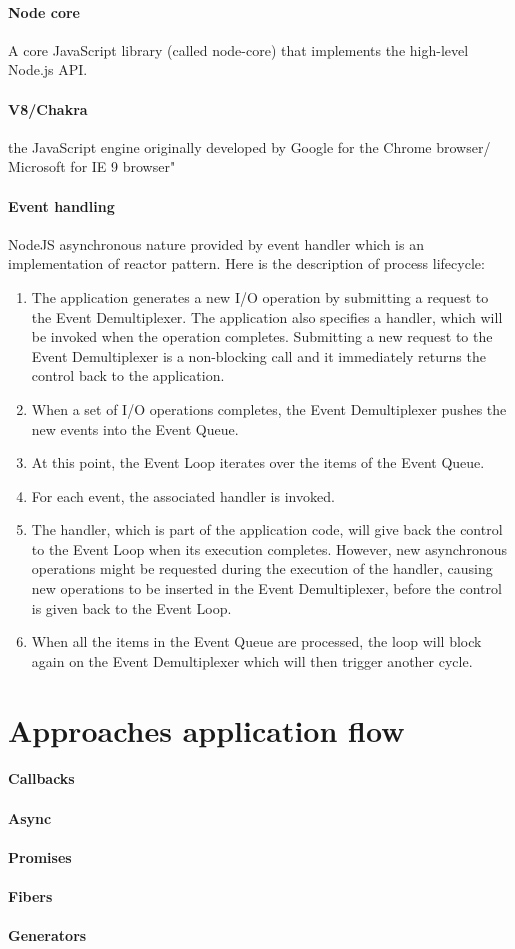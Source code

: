 \paragraph{Node core}
A core JavaScript library (called node-core) that implements the high-level Node.js API.

\paragraph{V8/Chakra} the JavaScript engine originally developed by Google for the Chrome browser/ Microsoft for IE 9 browser"\cite{nodejsbook} 

\paragraph{Event handling}
NodeJS asynchronous nature provided by event handler which is an implementation of reactor pattern. Here is the description of process lifecycle\cite{nodejsbook}:
\begin{enumerate}
\item The application generates a new I/O operation by submitting a request to the Event Demultiplexer. The application also specifies a handler, which will be invoked when the operation completes. Submitting a new request to the Event Demultiplexer is a non-blocking call and it immediately returns the control back to the application.
\item When a set of I/O operations completes, the Event Demultiplexer pushes the new events into the Event Queue.
\item At this point, the Event Loop iterates over the items of the Event Queue.
\item For each event, the associated handler is invoked.
\item The handler, which is part of the application code, will give back the control to the Event Loop when its execution completes. However, new asynchronous operations might be requested during the execution of the handler, causing new operations to be inserted in the Event Demultiplexer, before the control is given back to the Event Loop.
\item When all the items in the Event Queue are processed, the loop will block again on the Event Demultiplexer which will then trigger another cycle.
\end{enumerate}

\section{Approaches application flow}
	\paragraph{Callbacks}
	\paragraph{Async}
	\paragraph{Promises}
	\paragraph{Fibers}
	\paragraph{Generators}

